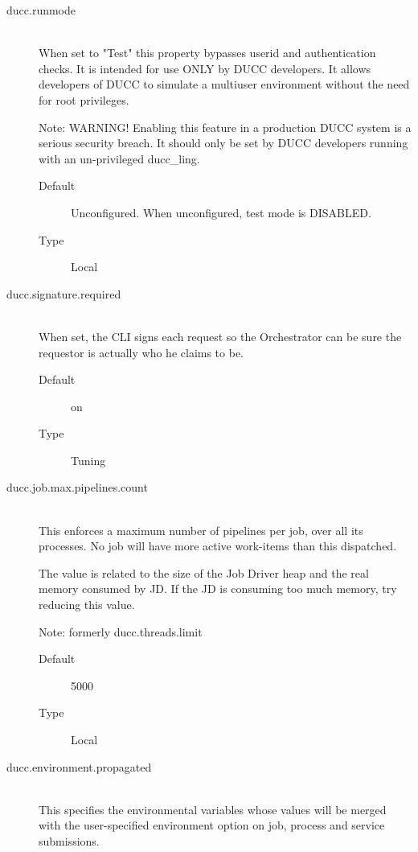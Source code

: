 \begin{description}
       \item[ducc.runmode] \hfill \\
         When set to "Test" this property bypasses userid and authentication checks. It is intended 
         for use ONLY by DUCC developers. It allows developers of DUCC to simulate a multiuser 
         environment without the need for root privileges. 
         
         Note: WARNING! Enabling this feature in a production DUCC system is a serious
         security breach. It should only be set by DUCC developers running with an un-privileged
         ducc\_ling.
         \begin{description}
           \item[Default] Unconfigured. When unconfigured, test mode is DISABLED.
           \item[Type] Local 
         \end{description}


        \item[ducc.signature.required] \hfill \\
          When set, the CLI signs each request so the Orchestrator can be sure the requestor is 
          actually who he claims to be. 
          \begin{description}            
            \item[Default] on             
            \item[Type] Tuning 
          \end{description}


       \item[ducc.job.max.pipelines.count] \hfill \\
         This enforces a maximum number of pipelines per job, over all its processes. No 
         job will have more active work-items than this dispatched.

         The value is related to the size of the Job Driver heap and the real memory consumed by JD.
         If the JD is consuming too much memory, try reducing this value.
         
         Note: formerly ducc.threads.limit
         
         \begin{description}
           \item[Default] 5000 
           \item[Type] Local 
         \end{description}

       \item[ducc.environment.propagated] \hfill \\
         This specifies the environmental variables whose values will be merged with the
         user-specified environment option on job, process and service submissions.


\end{description}
